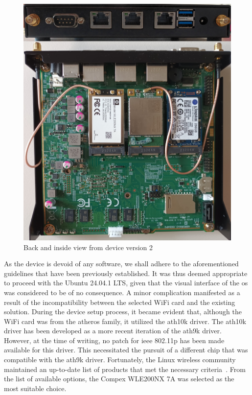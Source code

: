 \begin{figure}
	\centering
	\includegraphics[width=\textwidth]{Chapters/Figures/Implementation/devices/device_1.5.jpg}
	\caption{Back and inside view from device version 2}
	\label{fig:device_2}
\end{figure}


As the device is devoid of any software, we shall adhere to the aforementioned guidelines that have been previously established. It was thus deemed appropriate to proceed with the Ubuntu 24.04.1 LTS, given that the visual interface of the \gls{os} was considered to be of no consequence.
A minor complication manifested as a result of the incompatibility between the selected WiFi card and the existing solution. During the device setup process, it became evident that, although the WiFi card was from the atheros family, it utilized the ath10k driver. The ath10k driver has been developed as a more recent iteration of the ath9k driver. However, at the time of writing, no patch for \gls{ieee} 802.11p has been made available for this driver. This necessitated the pursuit of a different chip that was compatible with the ath9k driver. Fortunately, the Linux wireless community maintained an up-to-date list of products that met the necessary criteria~\cite{noauthor_external_nodate}. From the list of available options, the Compex WLE200NX 7A was selected as the most suitable choice.

